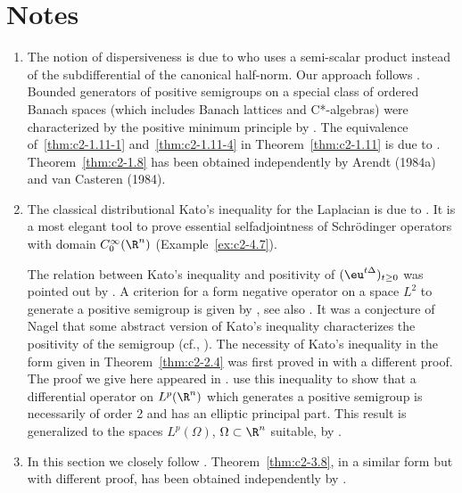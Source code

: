 \section*{Notes}
\begin{enumerate}[label=\emph{Section \arabic*:}, wide]
\item   The notion of dispersiveness is due to \textcite{phillips:1962} who uses a semi-scalar product instead of the subdifferential of the canonical half-norm.
Our approach follows \textcite{arendtchernoffkato:1982}.
Bounded generators of positive semigroups on a special class of ordered Banach spaces (which includes Banach lattices and C*-algebras) were characterized by the positive minimum principle by \textcite{evanshancheolsen:1979}.
The equivalence of~\ref{thm:c2-1.11-1} and~\ref{thm:c2-1.11-4}  in Theorem~\ref{thm:c2-1.11}  is due to \textcite{nageluhlig:1981}.
Theorem~\ref{thm:c2-1.8}   has been obtained independently by Arendt (1984a) and van Casteren (1984).

\item  
The classical distributional Kato's inequality for the Laplacian is due to \textcite{kato:1973}.
It is a most elegant tool to prove essential selfadjointness of Schrödinger operators with domain $C^{\infty}_0(\R^n)$ (\cf Example~\ref{ex:c2-4.7}).

The relation between Kato's inequality and positivity of\/ $(\eu^{t\Delta})_{t \geq 0}$ was pointed out by \textcite{simon:1977}.
A criterion for a form negative operator on a space $L^{2}$ to generate a positive semigroup is given by \textcite{beurlingdeny:1958}, see also \textcite[Vol. IV, Section XIII.12]{reedsimon:1978}.
It was a conjecture of Nagel that some abstract version of
Kato's inequality characterizes the positivity of the semigroup (cf., \textcite{nageluhlig:1981}). The necessity of Kato's inequality in the form given in Theorem~\ref{thm:c2-2.4}   was first proved in \textcite[Remark 3.10]{arendt:1982} with a different proof. 
The proof we give here appeared in \textcite{arendt:1984a}. 
\textcite{miyajimaokazawa:1984} use this inequality to show that a differential operator on $L^p(\R^n)$ which generates a positive semigroup is necessarily of order 2 and has an elliptic principal part. 
This result is generalized to the spaces $L^p(\Omega)$, $\Omega \subset \R^n$ suitable, by \textcite{miyajima:1986}.

\item  In this section we closely follow \textcite{arendt:1984a}. Theorem~\ref{thm:c2-3.8}, in a similar form but with different proof, has been obtained independently by \textcite{schep:1985}.


\end{enumerate}
